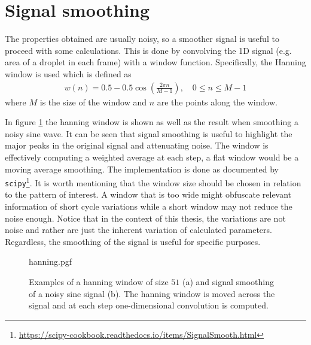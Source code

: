 \section{Signal smoothing}
The properties obtained are usually noisy, so a smoother signal is useful to proceed with some calculations. This is done by convolving the 1D signal (e.g. area of a droplet in each frame) with a window function. Specifically, the Hanning window is used which is defined as 
\begin{align*}
    w(n)=0.5-0.5\cos{\left(\frac{2\pi n}{M-1}\right)},\quad 0\leq n\leq M-1
\end{align*}
where $M$ is the size of the window and $n$ are the points along the window.

In figure \ref{fig:hanning} the hanning window is shown as well as the result when smoothing a noisy sine wave. It can be seen that signal smoothing is useful to highlight the major peaks in the original signal and attenuating noise. The window is effectively computing a weighted average at each step, a flat window would be a moving average smoothing. The implementation is done as documented by \texttt{scipy}\footnote{\url{https://scipy-cookbook.readthedocs.io/items/SignalSmooth.html}}. It is worth mentioning that the window size should be chosen in relation to the pattern of interest. A window that is too wide might obfuscate relevant information of short cycle variations while a short window may not reduce the noise enough. Notice that in the context of this thesis, the variations are not noise and rather are just the inherent variation of calculated parameters. Regardless, the smoothing of the signal is useful for specific purposes.

\begin{figure}
    \centering
    {hanning.pgf}
    \caption[Examples of a hanning window and signal smoothing]{Examples of a hanning window of size $51$ (a) and signal smoothing of a noisy sine signal (b). The hanning window is moved across the signal and at each step one-dimensional convolution is computed. }
    \label{fig:hanning}
\end{figure}